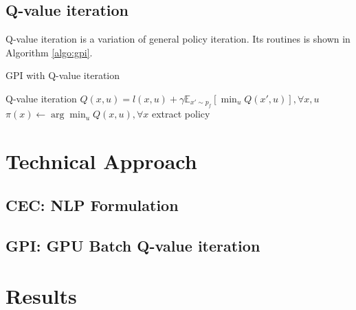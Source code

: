 \documentclass[conference]{IEEEtran}
\begin{document}
\subsection{Q-value iteration}
Q-value iteration is a variation of general policy iteration.
Its routines is shown in Algorithm \ref{algo:gpi}.
\begin{algorithm}
    \caption{GPI with Q-value iteration}
    \label{algo:gpi}
    \begin{algorithmic}[1] %
        \Comment Q-value iteration
        \State $Q(x,u) = l(x,u) + \gamma \mathbb{E}_{x'\sim p_f}\left[\min_u Q(x', u)\right], \forall x, u$
    \EndWhile
    \State $\pi(x) \leftarrow \arg\min_u Q(x, u), \forall x$
    \Comment extract policy
    \end{algorithmic}
\end{algorithm}


\section{Technical Approach}

\subsection{CEC: NLP Formulation}

\subsection{GPI: GPU Batch Q-value iteration}
\section{Results}
\end{document}
